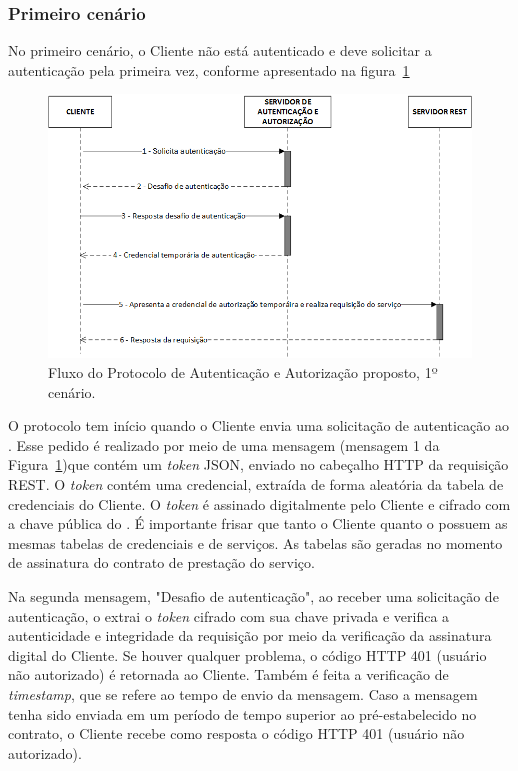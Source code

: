 \subsubsection{Primeiro cenário}

No primeiro cenário, o Cliente não está autenticado e deve solicitar a autenticação pela primeira vez, conforme apresentado na figura~\ref{fig:protocoloseguro}

\begin{figure}[!htb]
    \centering
    \includegraphics[width=1.0\textwidth]{fluxo_autenticacao.png}
    \caption{Fluxo do Protocolo de Autenticação e Autorização proposto, 1º cenário.}
    \label{fig:protocoloseguro}
\end{figure}


O protocolo tem início quando o Cliente envia uma solicitação de autenticação ao \servidorAA.
Esse pedido é realizado por meio de uma mensagem (mensagem 1 da Figura~\ref{fig:protocoloseguro})que contém um \emph{token} JSON, enviado no cabeçalho HTTP da requisição REST. O \emph{token} contém uma credencial, extraída de forma aleatória da tabela de credenciais do Cliente. O \emph{token} é assinado digitalmente pelo Cliente e cifrado com a chave pública do \servidorAA. É importante frisar que tanto o Cliente quanto o \servidorAA{} possuem as mesmas tabelas de credenciais e de serviços. As tabelas são geradas no momento de assinatura do contrato de prestação do serviço.

Na segunda mensagem, "Desafio de autenticação", ao receber uma solicitação de autenticação, o \servidorAA{} extrai o \emph{token} cifrado com sua chave privada e verifica a autenticidade e integridade da requisição por meio da verificação da assinatura digital do Cliente. Se houver qualquer problema, o código HTTP 401 (usuário não autorizado) é retornada ao Cliente.
Também é feita a verificação de \emph{timestamp}, que se refere ao tempo de envio da mensagem. Caso a mensagem tenha
sido enviada em um período de tempo superior ao pré-estabelecido no contrato, o Cliente recebe como resposta o código HTTP 401 (usuário não autorizado).

